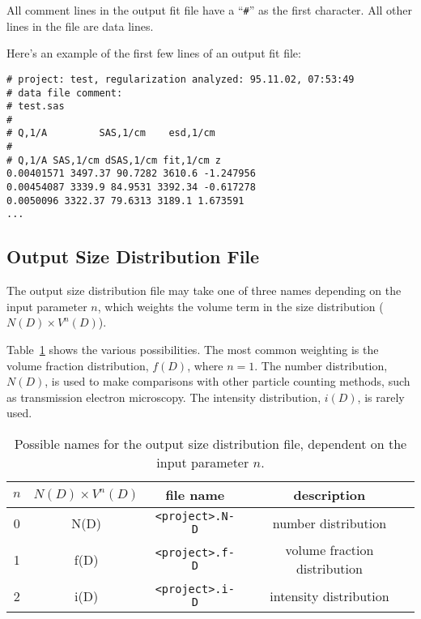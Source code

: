 \documentclass[letterpaper]{article}
\newlength{\fminilength}
\newenvironment{fminipage}[1][\linewidth]
 {\setlength{\fminilength}{#1}%
    \addtolength{\fminilength}{-2\fboxsep}%
    \addtolength{\fminilength}{-2\fboxrule}%
    \begin{lrbox}{\fminibox}\begin{minipage}{\fminilength}}
 {\end{minipage}\end{lrbox}\noindent\fbox{\usebox{\fminibox}}}
\begin{document}
All comment lines in the output fit file have a 
``\verb|#|'' as the first character.  All other 
lines in the file are data lines.

Here's an example of the first few lines of an output 
fit file: \par
\begin{center}
\begin{fminipage}[0.8\linewidth]
\small\begin{verbatim}
# project: test, regularization analyzed: 95.11.02, 07:53:49
# data file comment:
# test.sas
#
# Q,1/A         SAS,1/cm    esd,1/cm
#
# Q,1/A SAS,1/cm dSAS,1/cm fit,1/cm z
0.00401571 3497.37 90.7282 3610.6 -1.247956
0.00454087 3339.9 84.9531 3392.34 -0.617278
0.0050096 3322.37 79.6313 3189.1 1.673591
...
\end{verbatim}
\end{fminipage}
\end{center}

\subsection{Output Size Distribution File}

The output size distribution file may take one of 
three names depending on the input parameter $n$, 
which weights the volume term in the size 
distribution ($N(D) \times V^n(D)$).  

Table~\ref{t:size-file-extensions} shows the various 
possibilities.  The most common weighting is the 
volume fraction distribution, $f(D)$, where $n=1$.
The number distribution, $N(D)$, is used to make 
comparisons with other particle counting methods, 
such as transmission electron microscopy.  The 
intensity distribution, $i(D)$, is rarely used.
\begin{table}[tbp]
 \caption{Possible names for the output size 
 distribution file, dependent on the input parameter 
 $n$.}
 \begin{center}
   \begin{tabular}{|c|c|c|c|}
  \hline
  $n$ & $N(D) \times V^n(D)$ & file name & description  \\
  \hline
  0 & N(D) & \verb|<project>.N-D| & number distribution  \\
  \hline
  1 & f(D) & \verb|<project>.f-D| & volume fraction distribution  \\
  \hline
  2 & i(D) & \verb|<project>.i-D| & intensity distribution  \\
  \hline
   \end{tabular}
 \end{center}
 \protect\label{t:size-file-extensions}
\end{table}
\end{document}
